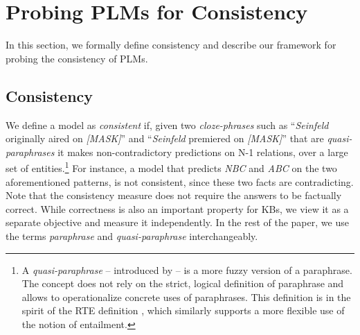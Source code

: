 \section{Probing PLMs for Consistency}
\label{sec:probe}

In this section, we formally define consistency and describe
our framework for probing the consistency of PLMs.

\subsection{Consistency}
We define a model as \emph{consistent} if, given  two
\textit{cloze-phrases} such as 
 ``\textit{Seinfeld} originally aired on \textit{[MASK]}'' and
``\textit{Seinfeld} premiered on \textit{[MASK]}'' that
are \textit{quasi-paraphrases} it makes non-contradictory
predictions on N-1 relations, over a large set of entities.\footnote{A \textit{quasi-paraphrase} -- introduced by \citet{what_is_paraphrase} -- is a more
  fuzzy version of a paraphrase. The concept does not rely
  on the strict, logical definition of paraphrase and
  allows to operationalize concrete uses of
  paraphrases. This definition is in the spirit of the RTE
  definition \cite{dagan-rte}, which similarly supports a
  more flexible use of the notion of entailment.}
 For instance, a model that predicts \textit{NBC} and \textit{ABC} on the two aforementioned patterns, is not consistent, since these two facts are contradicting.
Note that the consistency measure does not require the answers to be factually correct. While correctness is also an important property for KBs, we view it as a separate objective and measure it independently.
 In the rest of the paper, we use the terms \textit{paraphrase} and \textit{quasi-paraphrase} interchangeably.
 
